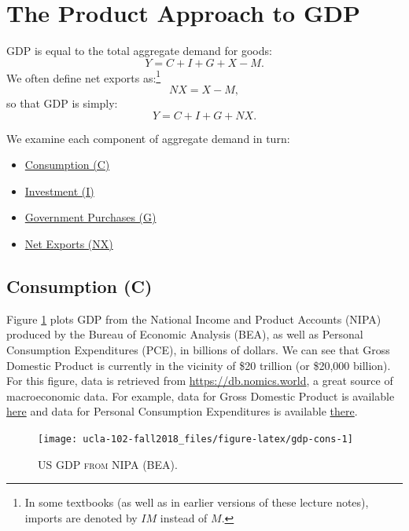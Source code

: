 \documentclass[]{book}
\providecommand{\tightlist}{%
  \setlength{\itemsep}{0pt}\setlength{\parskip}{0pt}}
\let\rmarkdownfootnote\footnote%
\def\footnote{\protect\rmarkdownfootnote}
\theoremstyle{definition}
\theoremstyle{definition}
\theoremstyle{definition}
\theoremstyle{remark}
\begin{document}
\hypertarget{gdp-product}{\section{The Product Approach to
GDP}\label{gdp-product}}

GDP is equal to the total aggregate demand for goods:
\[ Y = C + I + G + X -M.\] We often define net exports as:\footnote{In
  some textbooks (as well as in earlier versions of these lecture
  notes), imports are denoted by \(IM\) instead of \(M\).} \[NX = X-M,\]
so that GDP is simply: \[ Y = C + I + G + NX.\]

We examine each component of aggregate demand in turn:

\begin{itemize}
\tightlist
\item
  \protect\hyperlink{cons}{Consumption (C)}
\item
  \protect\hyperlink{inv}{Investment (I)}
\item
  \protect\hyperlink{gov}{Government Purchases (G)}
\item
  \protect\hyperlink{net-exports}{Net Exports (NX)}
\end{itemize}

\hypertarget{cons}{\subsection{Consumption (C)}\label{cons}}

Figure \ref{fig:gdp-cons} plots GDP from the National Income and Product
Accounts (NIPA) produced by the Bureau of Economic Analysis (BEA), as
well as Personal Consumption Expenditures (PCE), in billions of dollars.
We can see that Gross Domestic Product is currently in the vicinity of
\$20 trillion (or \$20,000 billion). For this figure, data is retrieved
from \url{https://db.nomics.world}, a great source of macroeconomic
data. For example, data for Gross Domestic Product is available
\href{https://db.nomics.world/BEA/NIPA-T10105/A191RC-Q}{here} and data
for Personal Consumption Expenditures is available
\href{https://db.nomics.world/BEA/NIPA-T10105/DPCERC-Q}{there}.



\begin{figure}

{\centering \texttt{[image: ucla-102-fall2018\_files/figure-latex/gdp-cons-1]} 

}

\caption{\textsc{US GDP from NIPA (BEA)}.}\label{fig:gdp-cons}
\end{figure}
\end{document}
